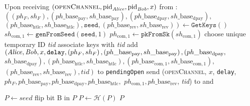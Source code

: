 \begin{algorithmic}[1]
    \State Upon receiving $\left(\textsc{openChannel}, \mathrm{pid}_{\mathit{Alice}},
    \mathrm{pid}_{\mathit{Bob}}, x\right)$ from \environment:
    \Indent
      \State $\left(\left(ph_F, sh_F\right),
      \left(ph\_\mathrm{base}_{\mathrm{pay}},
      sh\_\mathrm{base}_{\mathrm{pay}}\right),
      \left(ph\_\mathrm{base}_{\mathrm{dpay}},
      sh\_\mathrm{base}_{\mathrm{dpay}}\right),\right.$
      $\left.\left(ph\_\mathrm{base}_{\mathrm{htlc}},
      sh\_\mathrm{base}_{\mathrm{htlc}}\right), \mathtt{seed},
      \left(ph\_\mathrm{base}_{\mathrm{rev}},
      sh\_\mathrm{base}_{\mathrm{rev}}\right)\right) \gets
      \texttt{GetKeys}\left(\right)$
      \State $sh_{\mathrm{com}, 1} \gets
      \texttt{genFromSeed}\left(\mathtt{seed}, 1\right)$
      \State $ph_{\mathrm{com}, 1} \gets
      \mathtt{pkFromSk}\left(sh_{\mathrm{com}, 1}\right)$
      \State choose unique temporary ID \textit{tid} 
      \State associate keys with \textit{tid}
      \State add $\left(\mathit{Alice}, \mathit{Bob}, x, \mathtt{delay}, \left(ph_F,
      sh_F\right), \left(ph\_\mathrm{base}_{\mathrm{pay}},
      sh\_\mathrm{base}_{\mathrm{pay}}\right),
      \left(ph\_\mathrm{base}_{\mathrm{dpay}},\right.\right.$
      $\left.\left.sh\_\mathrm{base}_{\mathrm{dpay}}\right),
      \left(ph\_\mathrm{base}_{\mathrm{htlc}},
      sh\_\mathrm{base}_{\mathrm{htlc}}\right),
      \left(ph\_\mathrm{base}_{\mathrm{com}, 1},
      sh\_\mathrm{base}_{\mathrm{com}, 1}\right),\right.$
      $\left.\left(ph\_\mathrm{base}_{\mathrm{rev}},
      sh\_\mathrm{base}_{\mathrm{rev}}\right), \mathit{tid}\right)$ to
      \texttt{pendingOpen}
      \State send (\textsc{openChannel}, $x$, \texttt{delay}, $ph_F,
      ph\_\mathrm{base}_{\mathrm{pay}}, ph\_\mathrm{base}_{\mathrm{dpay}},
      ph\_\mathrm{base}_{\mathrm{htlc}},$ $ph_{\mathrm{com}, 1},
      ph\_\mathrm{base}_{\mathrm{rev}}$, \textit{tid}) to \bob{} and \adversary
    \EndIndent
    \State

     
      \State $P \gets seed$
          \State flip bit B in $P$
          \State $P \gets \mathcal{H}(P)$
        \EndIf
      \EndFor
      \State \Return $P$
    \EndFunction
    \State


\end{algorithmic}
